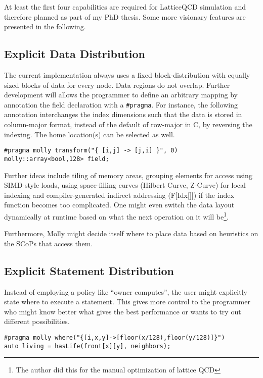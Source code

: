 \documentclass{sigplanconf}
\newcommand{\dquote}[1]{``#1''}
\begin{document}
At least the first four capabilities are required for LatticeQCD simulation and therefore planned as part of my PhD thesis. Some more visionary features are presented in the following.


\subsection{Explicit Data Distribution}

The current implementation always uses a fixed block-distribution with equally sized blocks of data for every node. Data regions do not overlap. Further development will allows the programmer to define an arbitrary mapping by annotation the field declaration with a \texttt{\#pragma}. For instance, the following annotation interchanges the index dimensions such that the data is stored in column-major format, instead of the default of row-major in C, by reversing the indexing. The home location(s) can be selected as well.

\begin{verbatim}
#pragma molly transform("{ [i,j] -> [j,i] }", 0)
molly::array<bool,128> field;
\end{verbatim}

Further ideas include tiling of memory areas, grouping elements for access using SIMD-style loads, using space-filling curves (Hilbert Curve, Z-Curve) for local indexing and compiler-generated indirect addressing (F[Idx[]]) if the index function becomes too complicated. One might even switch the data layout dynamically at runtime based on what the next operation on it will be\footnote{The author did this for the manual optimization of lattice QCD}.

Furthermore, Molly might decide itself where to place data based on heuristics on the SCoPs that access them.



\subsection{Explicit Statement Distribution}

Instead of employing a policy like \dquote{owner computes}, the user might explicitly state where to execute a statement. This gives more control to the programmer who might know better what gives the best performance or wants to try out different possibilities.

{\small
\begin{verbatim}
#pragma molly where("{[i,x,y]->[floor(x/128),floor(y/128)]}")
auto living = hasLife(front[x][y], neighbors);
\end{verbatim}
}
\end{document}
